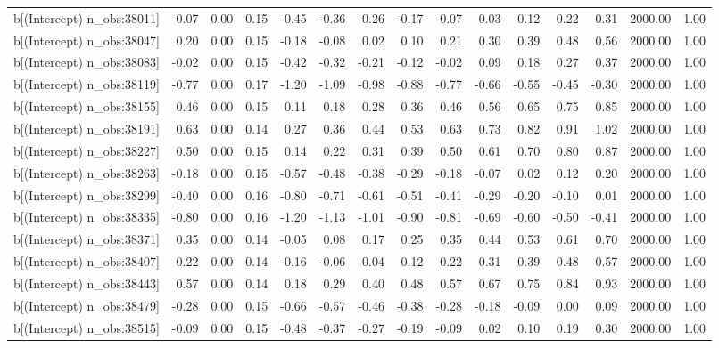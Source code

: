 \begin{table}[ht]
\begin{tabular}{rrrrrrrrrrrrrrr}
  b[(Intercept) n\_obs:38011] & -0.07 & 0.00 & 0.15 & -0.45 & -0.36 & -0.26 & -0.17 & -0.07 & 0.03 & 0.12 & 0.22 & 0.31 & 2000.00 & 1.00 \\ 
  b[(Intercept) n\_obs:38047] & 0.20 & 0.00 & 0.15 & -0.18 & -0.08 & 0.02 & 0.10 & 0.21 & 0.30 & 0.39 & 0.48 & 0.56 & 2000.00 & 1.00 \\ 
  b[(Intercept) n\_obs:38083] & -0.02 & 0.00 & 0.15 & -0.42 & -0.32 & -0.21 & -0.12 & -0.02 & 0.09 & 0.18 & 0.27 & 0.37 & 2000.00 & 1.00 \\ 
  b[(Intercept) n\_obs:38119] & -0.77 & 0.00 & 0.17 & -1.20 & -1.09 & -0.98 & -0.88 & -0.77 & -0.66 & -0.55 & -0.45 & -0.30 & 2000.00 & 1.00 \\ 
  b[(Intercept) n\_obs:38155] & 0.46 & 0.00 & 0.15 & 0.11 & 0.18 & 0.28 & 0.36 & 0.46 & 0.56 & 0.65 & 0.75 & 0.85 & 2000.00 & 1.00 \\ 
  b[(Intercept) n\_obs:38191] & 0.63 & 0.00 & 0.14 & 0.27 & 0.36 & 0.44 & 0.53 & 0.63 & 0.73 & 0.82 & 0.91 & 1.02 & 2000.00 & 1.00 \\ 
  b[(Intercept) n\_obs:38227] & 0.50 & 0.00 & 0.15 & 0.14 & 0.22 & 0.31 & 0.39 & 0.50 & 0.61 & 0.70 & 0.80 & 0.87 & 2000.00 & 1.00 \\ 
  b[(Intercept) n\_obs:38263] & -0.18 & 0.00 & 0.15 & -0.57 & -0.48 & -0.38 & -0.29 & -0.18 & -0.07 & 0.02 & 0.12 & 0.20 & 2000.00 & 1.00 \\ 
  b[(Intercept) n\_obs:38299] & -0.40 & 0.00 & 0.16 & -0.80 & -0.71 & -0.61 & -0.51 & -0.41 & -0.29 & -0.20 & -0.10 & 0.01 & 2000.00 & 1.00 \\ 
  b[(Intercept) n\_obs:38335] & -0.80 & 0.00 & 0.16 & -1.20 & -1.13 & -1.01 & -0.90 & -0.81 & -0.69 & -0.60 & -0.50 & -0.41 & 2000.00 & 1.00 \\ 
  b[(Intercept) n\_obs:38371] & 0.35 & 0.00 & 0.14 & -0.05 & 0.08 & 0.17 & 0.25 & 0.35 & 0.44 & 0.53 & 0.61 & 0.70 & 2000.00 & 1.00 \\ 
  b[(Intercept) n\_obs:38407] & 0.22 & 0.00 & 0.14 & -0.16 & -0.06 & 0.04 & 0.12 & 0.22 & 0.31 & 0.39 & 0.48 & 0.57 & 2000.00 & 1.00 \\ 
  b[(Intercept) n\_obs:38443] & 0.57 & 0.00 & 0.14 & 0.18 & 0.29 & 0.40 & 0.48 & 0.57 & 0.67 & 0.75 & 0.84 & 0.93 & 2000.00 & 1.00 \\ 
  b[(Intercept) n\_obs:38479] & -0.28 & 0.00 & 0.15 & -0.66 & -0.57 & -0.46 & -0.38 & -0.28 & -0.18 & -0.09 & 0.00 & 0.09 & 2000.00 & 1.00 \\ 
  b[(Intercept) n\_obs:38515] & -0.09 & 0.00 & 0.15 & -0.48 & -0.37 & -0.27 & -0.19 & -0.09 & 0.02 & 0.10 & 0.19 & 0.30 & 2000.00 & 1.00 \\ 

\end{tabular}
\end{table}
